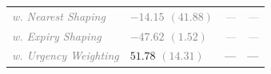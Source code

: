 \begin{table}
\begin{tabular}{llll}
    \textcolor{gray}{\itshape\hspace{1em}w. Nearest Shaping} & \textcolor{gray}{\itshape $-14.15$ {\small$(41.88)$}} & \textcolor{gray}{\itshape ---} & \textcolor{gray}{\itshape ---} \\
    \textcolor{gray}{\itshape\hspace{1em}w. Expiry Shaping} & \textcolor{gray}{\itshape $-47.62$ {\small$(1.52)$}} & \textcolor{gray}{\itshape ---} & \textcolor{gray}{\itshape ---} \\
    \textcolor{gray}{\itshape\hspace{1em}w. Urgency Weighting} & $51.78$ {\small\textcolor{gray}{$(14.31)$}} & --- & --- \\
    \bottomrule
  \end{tabular}
\end{table}
